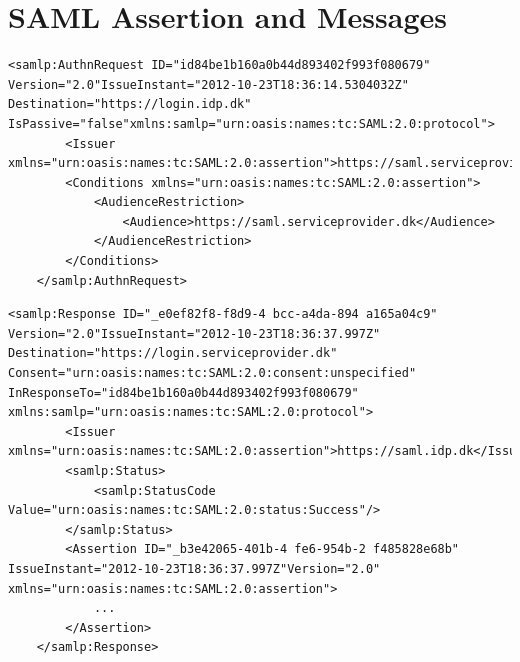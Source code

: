 \documentclass[twosided]{report}
\begin{document}
\appendix
\chapter{SAML Assertion and Messages}
\begin{lstlisting}[style=cxml, caption={Sample SAML AuthnRequest message \cite{jacob}.}]
	<samlp:AuthnRequest ID="id84be1b160a0b44d893402f993f080679" Version="2.0"IssueInstant="2012-10-23T18:36:14.5304032Z" Destination="https://login.idp.dk" IsPassive="false"xmlns:samlp="urn:oasis:names:tc:SAML:2.0:protocol">
		<Issuer xmlns="urn:oasis:names:tc:SAML:2.0:assertion">https://saml.serviceprovider.dk</Issuer>
		<Conditions xmlns="urn:oasis:names:tc:SAML:2.0:assertion">
			<AudienceRestriction>
				<Audience>https://saml.serviceprovider.dk</Audience>
			</AudienceRestriction>
		</Conditions>
	</samlp:AuthnRequest>
\end{lstlisting}

\begin{lstlisting}[style=cxml, caption={Sample SAML Response message without the content of the Assertion \cite{jacob}.}]
	<samlp:Response ID="_e0ef82f8-f8d9-4 bcc-a4da-894 a165a04c9" Version="2.0"IssueInstant="2012-10-23T18:36:37.997Z" Destination="https://login.serviceprovider.dk" Consent="urn:oasis:names:tc:SAML:2.0:consent:unspecified" InResponseTo="id84be1b160a0b44d893402f993f080679" xmlns:samlp="urn:oasis:names:tc:SAML:2.0:protocol">
		<Issuer xmlns="urn:oasis:names:tc:SAML:2.0:assertion">https://saml.idp.dk</Issuer>
		<samlp:Status>
			<samlp:StatusCode Value="urn:oasis:names:tc:SAML:2.0:status:Success"/>
		</samlp:Status>
		<Assertion ID="_b3e42065-401b-4 fe6-954b-2 f485828e68b" IssueInstant="2012-10-23T18:36:37.997Z"Version="2.0" xmlns="urn:oasis:names:tc:SAML:2.0:assertion">
			...
		</Assertion>
	</samlp:Response>
\end{lstlisting}
\end{document}
